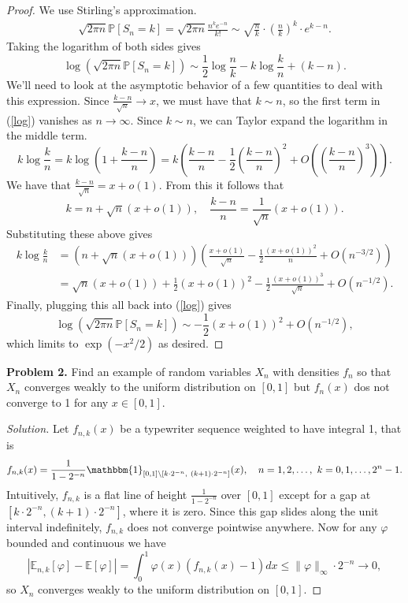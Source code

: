 \documentclass[11pt,letterpaper]{report}
\newcommand{\E}{\mathbb{E}}
\newcommand{\Prob}{\mathbb{P}}
\newcommand{\ind}{\mathbbm{1}}
\newenvironment{solution}
{\begin{proof}[Solution]}
{\end{proof}}
\begin{document}
\begin{proof}
	\noindent We use Stirling's approximation.
	\begin{align*}
		\sqrt{2\pi n}\Prob[S_n=k] = \sqrt{2\pi n}\frac{n^ke^{-n}}{k!}\sim \sqrt{\frac{n}{k}}\cdot \left(\frac{n}{k}\right)^k\cdot e^{k-n}.
	\end{align*}
	Taking the logarithm of both sides gives
	\begin{equation}\label{log}
	\log(\sqrt{2\pi n}\Prob[S_n=k]) \sim \frac{1}{2}\log\frac{n}{k} - k\log\frac{k}{n} + (k-n).
	\end{equation}
	We'll need to look at the asymptotic behavior of a few quantities to deal with this expression. Since $\frac{k-n}{\sqrt{n}}\to x$, we must have that $k\sim n$, so the first term in (\ref{log}) vanishes as $n\to \infty$. Since $k\sim n$, we can Taylor expand the logarithm in the middle term.
	\begin{equation}\label{remaminder}
	k\log\frac{k}{n} = k\log\left(1 + \frac{k-n}{n}\right) = k\left(\frac{k-n}{n} - \frac{1}{2}\left(\frac{k-n}{n}\right)^2 + O\left(\left(\frac{k-n}{n}\right)^3\right)\right).
	\end{equation}
	We have that $\frac{k-n}{\sqrt{n}} = x+o(1)$. From this it follows that
	\[
	k = n + \sqrt{n}(x+o(1)),\quad \frac{k-n}{n} = \frac{1}{\sqrt{n}}(x+o(1)). 
	\]
	Substituting these above gives
	\begin{align*}
		k\log \frac{k}{n} &= (n+\sqrt{n}(x+o(1)))\left(\frac{x+o(1)}{\sqrt{n}} - \frac{1}{2}\frac{(x+o(1))^2}{n} + O(n^{-3/2})\right)\\
		&= \sqrt{n}(x+o(1)) +\frac{1}{2}(x+o(1))^2 - \frac{1}{2}\frac{(x+o(1))^3}{\sqrt{n}} + O(n^{-1/2}).
	\end{align*}
	Finally, plugging this all back into (\ref{log}) gives
	\[
	\log(\sqrt{2\pi n}\Prob[S_n=k]) \sim-\frac{1}{2}(x+o(1))^2 + O(n^{-1/2}),
	\]
	which limits to $\exp(-x^2/2)$ as desired.
\end{proof}

\noindent\textbf{Problem 2. }
Find an example of random variables $X_n$ with densities $f_n$ so that $X_n$ converges weakly to the uniform distribution on $[0, 1]$ but $f_n(x)$ dos not converge to 1 for any $x\in [0,1]$.
\begin{solution}
	Let $f_{n,k}(x)$ be a typewriter sequence weighted to have integral 1, that is
	\[
	f_{n,k}(x) = \frac{1}{1-2^{-n}}\ind_{[0,1]\setminus [k\cdot 2^{-n},\ (k+1)\cdot 2^{-n}]}(x),\quad n = 1, 2, \ldots,\ k = 0, 1, \ldots, 2^{n}-1.
	\]
	Intuitively, $f_{n,k}$ is a flat line of height $\frac{1}{1-2^{-n}}$ over $[0,1]$ except for a gap at $[k\cdot 2^{-n}, (k+1)\cdot 2^{-n}]$, where it is zero. Since this gap slides along the unit interval indefinitely, $f_{n,k}$ does not converge pointwise anywhere. Now for any $\varphi$ bounded and continuous we have
	\[
	|\E_{n,k}[\varphi] - \E[\varphi]| = \int_0^1\varphi(x)(f_{n,k}(x) - 1)dx \leq \|\varphi\|_\infty\cdot 2^{-n}\to 0,
	\]
	so $X_n$ converges weakly to the uniform distribution on $[0,1]$.
\end{solution}
\end{document}
